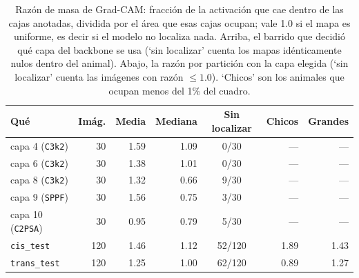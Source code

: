 \begin{table}[t]
  \centering
  \small
  \begin{tabular}{lrrrcrr}
    \toprule
    Qué & Imág. & Media & Mediana & Sin localizar & Chicos & Grandes \\
    \midrule
    capa 4 (\texttt{C3k2}) & 30 & 1.59 & 1.09 & 0/30 & --- & --- \\
    capa 6 (\texttt{C3k2}) & 30 & 1.38 & 1.01 & 0/30 & --- & --- \\
    capa 8 (\texttt{C3k2}) & 30 & 1.32 & 0.66 & 9/30 & --- & --- \\
    capa 9 (\texttt{SPPF}) & 30 & 1.56 & 0.75 & 3/30 & --- & --- \\
    capa 10 (\texttt{C2PSA}) & 30 & 0.95 & 0.79 & 5/30 & --- & --- \\
    \texttt{cis\_test} & 120 & 1.46 & 1.12 & 52/120 & 1.89 & 1.43 \\
    \texttt{trans\_test} & 120 & 1.25 & 1.00 & 62/120 & 0.89 & 1.27 \\
    \bottomrule
  \end{tabular}
  \caption{Razón de masa de Grad-CAM: fracción de la activación que cae dentro de las cajas anotadas, dividida por el área que esas cajas ocupan; vale 1.0 si el mapa es uniforme, es decir si el modelo no localiza nada. Arriba, el barrido que decidió qué capa del backbone se usa (`sin localizar' cuenta los mapas idénticamente nulos dentro del animal). Abajo, la razón por partición con la capa elegida (`sin localizar' cuenta las imágenes con razón $\leq 1.0$). `Chicos' son los animales que ocupan menos del 1\% del cuadro.}
  \label{tab:gradcam}
\end{table}
